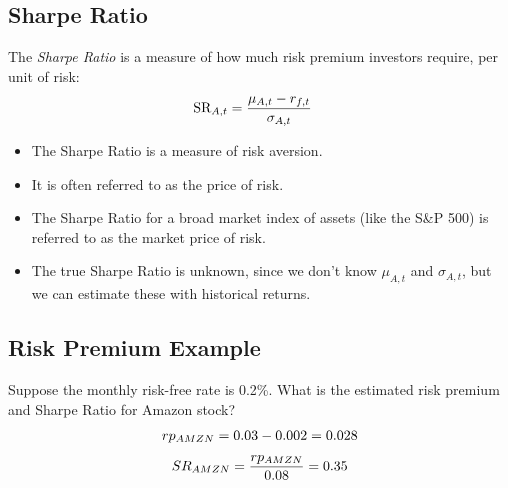 \documentclass[letterpaper,10pt,english]{sphinxmanual}
\begin{document}
\subsection{Sharpe Ratio}
\label{risk:sharpe-ratio}
The \emph{Sharpe Ratio} is a measure of how much risk premium investors
require, per unit of risk:
\begin{gather}
\begin{split}\text{SR}_{A,t} & = \frac{\mu_{A,t} - r_{f,t}}{\sigma_{A,t}}\end{split}\notag
\end{gather}\begin{itemize}
\item {} 
The Sharpe Ratio is a measure of risk aversion.

\end{itemize}
\begin{itemize}
\item {} 
It is often referred to as the price of risk.

\end{itemize}
\begin{itemize}
\item {} 
The Sharpe Ratio for a broad market index of assets (like the
S\&P 500) is referred to as the market price of risk.

\end{itemize}
\begin{itemize}
\item {} 
The true Sharpe Ratio is unknown, since we don't know
$\mu_{A,t}$ and $\sigma_{A,t}$, but we can estimate
these with historical returns.

\end{itemize}


\subsection{Risk Premium Example}
\label{risk:risk-premium-example}
Suppose the monthly risk-free rate is 0.2\%. What is the estimated
risk premium and Sharpe Ratio for Amazon stock?
\begin{gather}
\begin{split}rp_{AMZN} = 0.03 - 0.002 = 0.028\end{split}\notag
\end{gather}\begin{gather}
\begin{split}SR_{AMZN} = \frac{rp_{AMZN}}{0.08} = 0.35\end{split}\notag
\end{gather}
\end{document}
